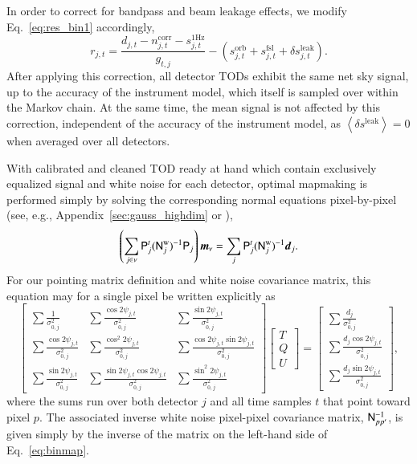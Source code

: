 \documentclass[twocolumn]{aa}
\renewcommand{\d}[0]{\vec{d}}
\newcommand{\m}[0]{\vec{m}}
\newcommand{\N}[0]{\tens{N}}
\renewcommand{\P}[0]{\tens{P}}
\begin{document}
In order to correct for bandpass and beam leakage effects, we modify
Eq.~\eqref{eq:res_bin1} accordingly,
\begin{equation}
  r_{j,t} = \frac{d_{j,t}- n^{\mathrm{corr}}_{j,t} - s^{\mathrm{1Hz}}_{j,t}}{g_{t,j}} - \left(s^{\mathrm{orb}}_{j,t}  
  + s^{\mathrm{fsl}}_{j,t} + \delta s^{\mathrm{leak}}_{j, t}\right).
\end{equation}
After applying this correction, all detector TODs exhibit the same net
sky signal, up to the accuracy of the instrument model, which itself
is sampled over within the Markov chain. At the same time, the mean
signal is not affected by this correction, independent of the accuracy
of the instrument model, as ${\left<\delta s^{\mathrm{leak}}\right> =
0}$ when averaged over all detectors.

With calibrated and cleaned TOD ready at hand which contain
exclusively equalized signal and white noise for each detector,
optimal mapmaking is performed simply by solving the corresponding
normal equations pixel-by-pixel (see, e.g.,
Appendix~\ref{sec:gauss_highdim} or \citealp{ashdown:2007}),
\begin{equation}
\left(\sum_{j \in \nu} \P_j^t (\N^{\mathrm{w}}_{j})^{-1} \P_j\right) \m_{\nu} =
\sum_j \P_j^t (\N^{\mathrm{w}}_j)^{-1}\d_j.
\label{eq:binmap}
\end{equation}
For our pointing matrix definition and white noise covariance matrix,
this equation may for a single pixel be written explicitly as
{\scriptsize
\begin{equation}
  \left[\begin{array}{ccc}
      \sum \frac{1}{\sigma_{0,j}^2} & \sum \frac{\cos
        2\psi_{j,t}}{\sigma_{0,j}^2} & \sum \frac{\sin
        2\psi_{j,t}}{\sigma_{0,j}^2} \\
            \sum \frac{\cos 2\psi_{j,t}}{\sigma_{0,j}^2} & \sum \frac{\cos^2
        2\psi_{j,t}}{\sigma_{0,j}^2} & \sum \frac{\cos 2\psi_{j,t} \sin
              2\psi_{j,t}}{\sigma_{0,j}^2} \\
                  \sum \frac{\sin 2\psi_{j,t}}{\sigma_{0,j}^2} & \sum
                  \frac{\sin 2\psi_{j,t} \cos
        2\psi_{j,t}}{\sigma_{0,j}^2} & \sum \frac{\sin^2
        2\psi_{j,t}}{\sigma_{0,j}^2}
    \end{array}\right]
  \left[\begin{array}{c}
      T \\ Q \\ U
    \end{array}\right]
  =
  \left[\begin{array}{c}
      \sum \frac{d_j}{\sigma_{0,j}^2} \\ \sum \frac{d_j\cos
        2\psi_{j,t}}{\sigma_{0,j}^2} \\ \sum \frac{d_j\sin
        2\psi_{j,t}}{\sigma_{0,j}^2}
    \end{array}\right],
  \label{eq:binmap2}
\end{equation}}
where the sums run over both detector $j$ and all time samples $t$ that
point toward pixel $p$. The associated inverse white noise pixel-pixel
covariance matrix, $\N^{-1}_{pp'}$, is given simply by the inverse
of the matrix on the left-hand side of Eq.~\eqref{eq:binmap}.
\end{document}
